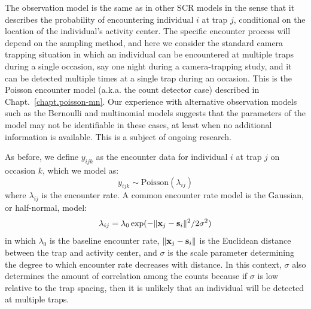 The observation model is the same as in other SCR models %
in the sense that it describes the probability of encountering individual
$i$ at trap $j$, conditional on the location of the individual's
activity center. The specific encounter process will depend on the
sampling method, and here we consider the standard camera trapping
situation in which an individual can be encountered at multiple traps
during a single occasion, say one night during a camera-trapping
study, and it can be detected multiple times at a single trap during
an occasion. This is the Poisson encounter model (a.k.a. the count
detector case)
described in Chapt.~\ref{chapt.poisson-mn}. Our
experience with alternative observation models such as the
Bernoulli and multinomial models
suggests that the parameters of the model may not be identifiable in
these cases, %
at least when no additional information is available. This is a subject of
ongoing research.

As before, we define $y_{ijk}$ as the
encounter data for individual $i$ at trap $j$ on occasion $k$, which
we model as:
\begin{equation}
 y_{ijk} \sim \mbox{Poisson}(\lambda_{ij})
\label{eq.latentPoisson}
\end{equation}
where $\lambda_{ij}$ is the encounter rate. A common encounter rate model is the
Gaussian, or half-normal, model:
\[
\lambda_{ij} = \lambda_0 \exp( - \| {\bf x}_j - {\bf s}_i \|^2 / 2\sigma^2)
\]
in which $\lambda_0$ is the baseline encounter rate,
$\| {\bf x}_j - {\bf s}_i \|$ is the Euclidean distance between the
trap and activity center, and $\sigma$ is the
scale parameter determining the degree to which encounter rate decreases with
distance. In this context, $\sigma$ also determines the amount of
correlation among the counts because if $\sigma$ is low relative to
the trap spacing, then it is unlikely that an individual will be
detected at multiple traps.

